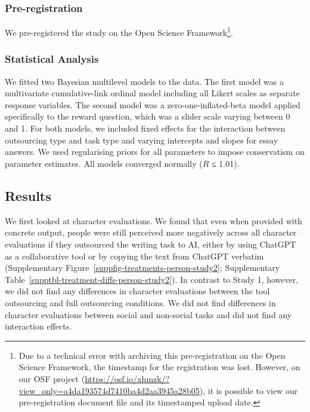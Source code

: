 \documentclass[
  man,
  floatsintext,
  longtable,
  nolmodern,
  notxfonts,
  notimes,
  colorlinks=true,linkcolor=blue,citecolor=blue,urlcolor=blue]{apa7}
\begin{document}
\subsubsection*{Pre-registration}\label{pre-registration-1}

We pre-registered the study on the Open Science Framework\footnote{Due
  to a technical error with archiving this pre-registration on the Open
  Science Framework, the timestamp for the registration was lost.
  However, on our OSF project
  (\url{https://osf.io/xhmzk/?view_only=a4da193574d7410ba4d2aa3945a28b05}),
  it is possible to view our pre-registration document file and its
  timestamped upload date.}.

\subsubsection*{Statistical Analysis}\label{statistical-analysis-1}

We fitted two Bayesian multilevel models to the data. The first model
was a multivariate cumulative-link ordinal model including all Likert
scales as separate response variables. The second model was a
zero-one-inflated-beta model applied specifically to the reward
question, which was a slider scale varying between 0 and 1. For both
models, we included fixed effects for the interaction between
outsourcing type and task type and varying intercepts and slopes for
essay answers. We used regularising priors for all parameters to impose
conservatism on parameter estimates. All models converged normally
(\(\hat{R}\) ≤ 1.01).

\subsection*{Results}\label{results-1}

We first looked at character evaluations. We found that even when
provided with concrete output, people were still perceived more
negatively across all character evaluations if they outsourced the
writing task to AI, either by using ChatGPT as a collaborative tool or
by copying the text from ChatGPT verbatim
(Supplementary Figure~\ref{suppfig-treatments-person-study2};
Supplementary Table~\ref{supptbl-treatment-diffs-person-study2}). In
contrast to Study 1, however, we did not find any differences in
character evaluations between the tool outsourcing and full outsourcing
conditions. We did not find differences in character evaluations between
social and non-social tasks and did not find any interaction effects.
\end{document}
